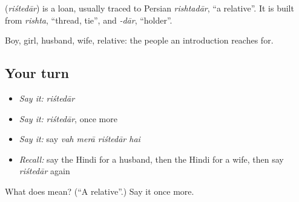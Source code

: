 \begin{cousinweb}
\textbf{} (\emph{riśtedār}) is a loan, usually traced to Persian \emph{rishtadār}, \textquotedblleft{}a relative\textquotedblright{}. It is built from \emph{rishta}, \textquotedblleft{}thread, tie\textquotedblright{}, and \emph{-dār}, \textquotedblleft{}holder\textquotedblright{}.
\end{cousinweb}

\begin{grammarlens}[title={What you've built}]
Boy, girl, husband, wife, relative: the people an introduction reaches for.
\end{grammarlens}

\subsection*{Your turn}
\begin{itemize}
\raggedright
  \item \emph{Say it:} \emph{riśtedār}
  \item \emph{Say it:} \emph{riśtedār}, once more
  \item \emph{Say it:} say \emph{vah merā riśtedār hai}
  \item \emph{Recall:} say the Hindi for a husband, then the Hindi for a wife, then say \emph{riśtedār} again
\end{itemize}

\begin{tcolorbox}[breakable,colback=teal!4,colframe=teal!35!black,title={Before you move on}]
What does  mean? (\textquotedblleft{}A relative\textquotedblright{}.) Say it once more.
\end{tcolorbox}
